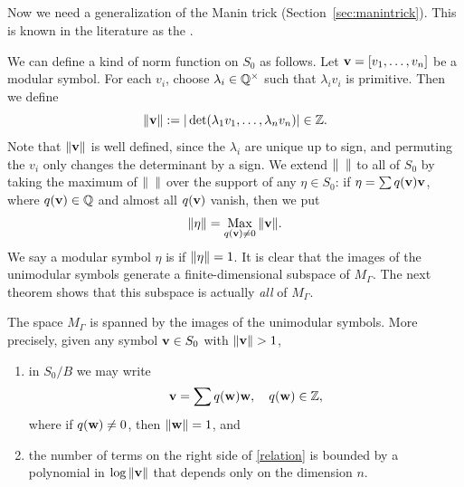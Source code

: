\subsection{}
%
Now we need a generalization of the Manin trick
(Section~\ref{sec:manintrick}).  This is known in the literature as the
.

We can define a kind of norm function on $S_{0}$ as follows.  Let ${\mathbf {v}}
=[v_{1},\dotsc ,v_{n}]$ be a modular symbol.  For each $v_{i}$, 
choose $\lambda_{i}\in \mathbb{Q}^{\times}$ such that $\lambda_{i}v_{i}$ is
primitive.  Then we define 
\[
\|{\mathbf {v}}\| := |\det (\lambda_{1}v_{1},\dotsc ,\lambda_{n}v_{n})| \in \mathbb{Z} .
\]
Note that $\|{\mathbf {v}}\|$ is well defined, since the $\lambda_{i}$ are
unique up to sign, and permuting the $v_{i}$ only changes the
determinant by a sign.  We extend $\|\phantom{a}\|$ to all of $S_{0}$
by taking the maximum of $\|\phantom{a}\|$ over the support of any
$\eta \in S_{0}$: if $\eta =\sum q ({\mathbf {v}}){\mathbf {v}}$, where $q ({\mathbf {v}})\in \mathbb{Q}$
and almost all $q ({\mathbf {v}})$ vanish, then we put
\[
\|\eta\| = \operatorname*{Max}_{q ({\mathbf {v}}) \not =0} \|{\mathbf {v}}\|.
\]
We say a modular symbol $\eta $ is  if $\|\eta \|
= 1$.  It is clear that the images of the unimodular symbols generate
a finite-dimensional subspace of $M_{\Gamma}$.  The next theorem shows
that this subspace is actually \emph{all} of $M_{\Gamma }$.

\begin{theorem}
\label{thm:modsymbalg}
The space $M_{\Gamma }$ is spanned by
the images of the unimodular symbols.  More precisely, given any symbol ${\mathbf {v}}\in S_{0}$ with
$\norm{\vv}>1$, 
\begin{enumerate}
\item in $S_{0}/B$ we may write 
\begin{equation}\label{relation}
{\mathbf {v}} = \sum q ({\mathbf {w}}){\mathbf {w}} , \quad q ({\mathbf {w}})\in \mathbb{Z} ,
\end{equation}
where if $q ({\mathbf {w}})\not =0$, then $\|{\mathbf {w}}\| = 1$, and 
\item the number of terms on the right side of \eqref{relation} is bounded
by a polynomial in $\log \|{\mathbf {v}}\|$ that depends only on the dimension $n$.
\end{enumerate}
\end{theorem}

